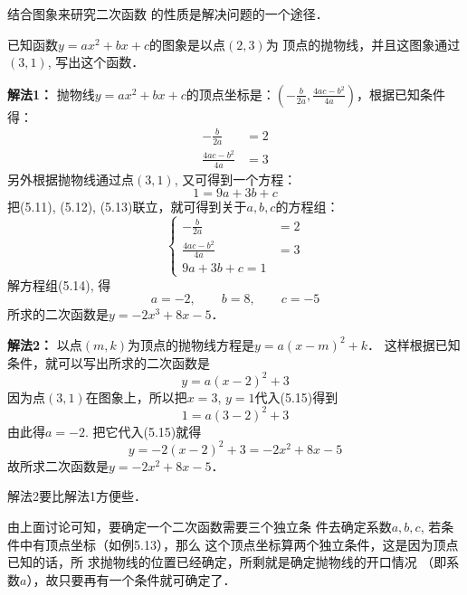结合图象来研究二次函数
的性质是解决问题的一个途径．

\begin{example}
    已知函数$y=ax^2+bx+c$的图象是以点$(2,3)$为
顶点的抛物线，并且这图象通过$(3,1)$, 写出这个函数．
\end{example}

\begin{solution}
\textbf{解法1：} 抛物线$y=ax^2+bx+c$的顶点坐标是：$\left(-\frac{b}{2a},\frac{4ac-b^2}{4a}\right)$，根据已知条件得：
\begin{align}
    -\frac{b}{2a}&=2\\
\frac{4ac-b^2}{4a}&=3
\end{align}
另外根据抛物线通过点$(3,1)$, 又可得到一个方程：
\begin{equation}
    1=9a+3b+c
\end{equation}
把(5.11), (5.12), (5.13)联立，就可得到关于$a,b,c$的方程组：
\begin{equation}
    \begin{cases}
        -\frac{b}{2a}&=2\\
\frac{4ac-b^2}{4a}&=3\\
9a+3b+c=1
    \end{cases}
\end{equation}
解方程组(5.14), 得
\[a=-2,\qquad b=8,\qquad c=-5\]
所求的二次函数是$y=-2x^3+8x-5$．

\textbf{解法2：} 以点$(m,k)$为顶点的抛物线方程是$y=a(x-m)^2+k$．
这样根据已知条件，就可以写出所求的二次函数是
\begin{equation}
    y=a(x-2)^2+3
\end{equation}
因为点$(3,1)$在图象上，所以把$x=3$, $y=1$代入(5.15)得到
\[1=a(3-2)^2+3\]
由此得$a=-2$. 把它代入(5.15)就得
\[y=-2(x-2)^2+3=-2x^2+8x-5\]
故所求二次函数是$y=-2x^2+8x-5$．

解法2要比解法1方便些．
\end{solution}

由上面讨论可知，要确定一个二次函数需要三个独立条
件去确定系数$a,b,c$, 若条件中有顶点坐标（如例5.13），那么
这个顶点坐标算两个独立条件，这是因为顶点已知的话，所
求抛物线的位置已经确定，所剩就是确定抛物线的开口情况
（即系数$a$），故只要再有一个条件就可确定了．

